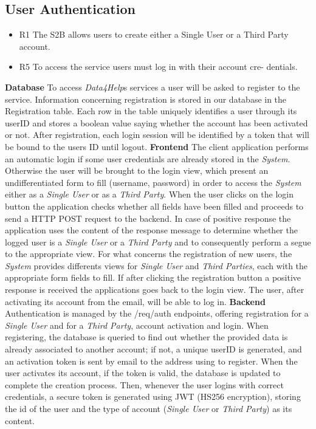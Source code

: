 \documentclass[titlepage]{article}
\begin{document}
	\subsection{User Authentication}
	\begin{itemize}
		\item R1 The S2B allows users to create either a Single User or a Third Party account.
		\item R5 To access the service users must log in with their account cre- dentials.
	\end{itemize}
	
	{\bf Database} \newline
	To access {\it Data4Help}\textsc{}s services a user will be asked to register to the service. Information concerning registration is stored in our database in the Registration table. Each row in the table uniquely identifies a user through its userID and stores a boolean value saying whether the account has been activated or not. After registration, each login session will be identified by a token that will be bound to the user\textsc{}s ID until logout.
	\newline
	\newline
	\noindent
	{\bf Frontend} \newline
	The client application performs an automatic login if some user credentials are already stored in the {\it System}. Otherwise the user will be brought to the login view, which present an undifferentiated form to fill (username, password) in order to access the {\it System} either as a {\it Single User} or as a {\it Third Party}. When the user clicks on the login button the application checks whether all fields have been filled and proceeds to send a HTTP POST request to the backend. In case of positive response the application uses the content of the response message to determine whether the logged user is a {\it Single User} or a {\it Third Party} and to consequently perform a segue to the appropriate view. For what concerns the registration of new users,  the {\it System} provides differents views for {\it Single User} and {\it Third Parties}, each with the appropriate form fields to fill. If after clicking the registration button a positive response is received the applications goes back to the login view. The user, after activating its account from the email, will be able to log in.   
	\newline
	\newline
	\noindent
	{\bf Backend} \newline
	Authentication is managed by the /req/auth endpoints, offering registration for a {\it Single User} and for a {\it Third Party}, account activation and login. 
	When registering, the database is queried to find out whether the provided data is already associated to another account; if not, a unique userID is generated, and an activation token is sent by email to the address using to register.
	When the user activates its account, if the token is valid, the database is updated to complete the creation process. Then, whenever the user logins with correct credentials, a secure token is generated using JWT (HS256 encryption), storing the id of the user and the type of account ({\it Single User} or {\it Third Party}) as its content.
	
\end{document}
